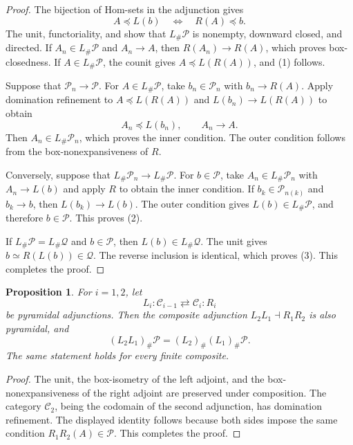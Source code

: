 \documentclass{amsart}
\theoremstyle{plain}
\newtheorem{proposition}[theorem]{Proposition}
\theoremstyle{definition}
\theoremstyle{remark}
\begin{document}
\begin{proof}
The bijection of Hom-sets in the adjunction gives
\begin{equation}
\label{eq:adjunction-order}
A\preceq L(b)\quad\Longleftrightarrow\quad R(A)\preceq b.
\end{equation}
The unit, functoriality, and  show that $L_{\#}\mathcal P$ is nonempty, downward closed, and directed. If $A_n\in L_{\#}\mathcal P$ and $A_n\to A$, then $R(A_n)\to R(A)$, which proves box-closedness. If $A\in L_{\#}\mathcal P$, the counit gives $A\preceq L(R(A))$, and (1) follows.

Suppose that $\mathcal P_n\to\mathcal P$. For $A\in L_{\#}\mathcal P$, take $b_n\in\mathcal P_n$ with $b_n\to R(A)$. Apply domination refinement to $A\preceq L(R(A))$ and $L(b_n)\to L(R(A))$ to obtain
\[A_n\preceq L(b_n),\qquad A_n\longrightarrow A.\]
Then $A_n\in L_{\#}\mathcal P_n$, which proves the inner condition. The outer condition follows from the box-nonexpansiveness of $R$.

Conversely, suppose that $L_{\#}\mathcal P_n\to L_{\#}\mathcal P$. For $b\in\mathcal P$, take $A_n\in L_{\#}\mathcal P_n$ with $A_n\to L(b)$ and apply $R$ to obtain the inner condition. If $b_k\in\mathcal P_{n(k)}$ and $b_k\to b$, then $L(b_k)\to L(b)$. The outer condition gives $L(b)\in L_{\#}\mathcal P$, and therefore $b\in\mathcal P$. This proves (2).

If $L_{\#}\mathcal P=L_{\#}\mathcal Q$ and $b\in\mathcal P$, then $L(b)\in L_{\#}\mathcal Q$. The unit gives $b\simeq R(L(b))\in\mathcal Q$. The reverse inclusion is identical, which proves (3).
This completes the proof.
\end{proof}

\begin{proposition}
\label{prop:pyramidal-adjunction-composition}
For $i=1,2$, let
\[L_i\colon\mathcal C_{i-1}\rightleftarrows\mathcal C_i\colon R_i\]
be pyramidal adjunctions. Then the composite adjunction $L_2L_1\dashv R_1R_2$ is also pyramidal, and
\[(L_2L_1)_{\#}\mathcal P=(L_2)_{\#}(L_1)_{\#}\mathcal P.\]
The same statement holds for every finite composite.
\end{proposition}

\begin{proof}
The unit, the box-isometry of the left adjoint, and the box-nonexpansiveness of the right adjoint are preserved under composition. The category $\mathcal C_2$, being the codomain of the second adjunction, has domination refinement. The displayed identity follows because both sides impose the same condition $R_1R_2(A)\in\mathcal P$.
This completes the proof.
\end{proof}
\end{document}
